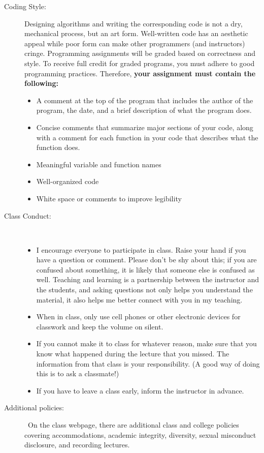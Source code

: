\documentclass [letterpaper,11pt]{article}
\begin{document}
\begin{description}
\item[Coding Style:]
Designing algorithms and writing the corresponding code is not a dry, mechanical process, but an art form.  Well-written code has an aesthetic appeal while poor form can make other programmers (and instructors) cringe. Programming assignments will be graded based on correctness and style. To receive full credit for graded programs, you must adhere to good programming practices. Therefore, \textbf{your assignment must contain the following:}
\begin{itemize}\setlength{\itemsep}{0em}\setlength{\parskip}{0pt}
	\item A comment at the top of the program that includes the author of the program,
	the date, and a brief description of what the program does.
	\item Concise comments that summarize major sections of your code, along with a comment
	for each function in your code that describes what the function does.
	\item Meaningful variable and function names
	\item Well-organized code
	\item White space or comments to improve legibility
\end{itemize}


\item[Class Conduct:] \
   \begin{itemize}\setlength{\itemsep}{0em}\setlength{\parskip}{0pt}
   	\item I encourage everyone to participate in class.  Raise your hand if you have
	a question or comment.  Please don't be shy about this; if you are confused about
	something, it is likely that someone else is confused as well.
		Teaching and learning is a partnership between the instructor and the students, and asking questions not only helps you understand the material, it also helps me better connect with you in my teaching.
	\item When in class, only use cell phones or other electronic devices for classwork and keep the volume on silent.
	\item  If you cannot make it to class for whatever reason, make sure that you know what happened during the lecture that you missed. The information from that class is your responsibility. (A good way of doing this is to ask a classmate!)
     \item  If you have to leave a class early, inform the instructor in advance. 
     \end{itemize}
     
\item[Additional policies:] \
On the class webpage, there are additional class and college policies covering accommodations, academic integrity, diversity, sexual misconduct disclosure, and recording lectures.  
   
   
\end{description}

   
\end{document}
